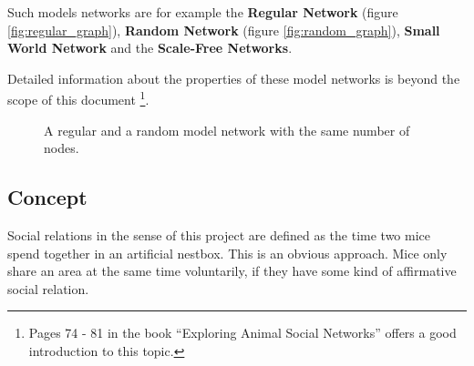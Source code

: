 Such models networks are for example the \textbf{Regular Network} (figure \ref{fig:regular_graph}), \textbf{Random Network} (figure \ref{fig:random_graph}), \textbf{Small World Network} and the \textbf{Scale-Free Networks}.

Detailed information about the properties of these model networks is beyond the scope of this document \footnote{Pages 74 - 81 in the book ``Exploring Animal Social Networks''\cite{croft:07} offers a good introduction to this topic.}.


\begin{figure}[htpb]%
	\centering 
	\qquad 
	\caption{A regular  and a random  model network with the same number of nodes.} 
	 
\end{figure} 

\subsection{Concept}
\label{subsec:graph_concept}

Social relations in the sense of this project are defined as the time two mice spend together in an artificial nestbox. This is an obvious approach. Mice only share an area at the same time voluntarily, if they have some kind of affirmative social relation.

